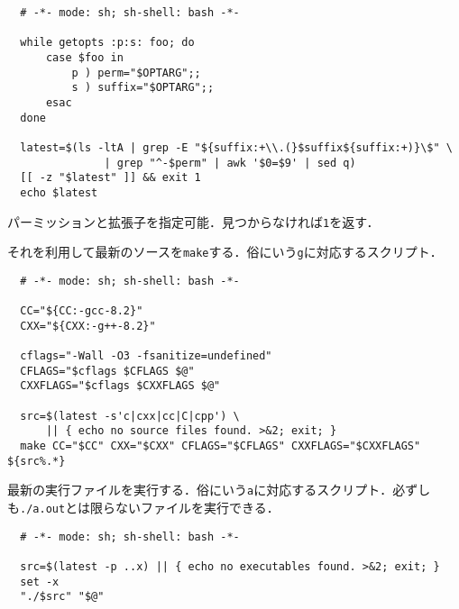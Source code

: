 \documentclass[a4paper]{jsarticle}
\begin{document}
\begin{lstlisting}
  # -*- mode: sh; sh-shell: bash -*-
  
  while getopts :p:s: foo; do
      case $foo in
          p ) perm="$OPTARG";;
          s ) suffix="$OPTARG";;
      esac
  done
  
  latest=$(ls -ltA | grep -E "${suffix:+\\.(}$suffix${suffix:+)}\$" \
               | grep "^-$perm" | awk '$0=$9' | sed q)
  [[ -z "$latest" ]] && exit 1
  echo $latest
\end{lstlisting}
パーミッションと拡張子を指定可能．見つからなければ\texttt{1}を返す．

それを利用して最新のソースを\texttt{make}する．俗にいう\texttt{g}に対応するスクリプト．
\begin{lstlisting}
  # -*- mode: sh; sh-shell: bash -*-
  
  CC="${CC:-gcc-8.2}"
  CXX="${CXX:-g++-8.2}"
  
  cflags="-Wall -O3 -fsanitize=undefined"
  CFLAGS="$cflags $CFLAGS $@"
  CXXFLAGS="$cflags $CXXFLAGS $@"
  
  src=$(latest -s'c|cxx|cc|C|cpp') \
      || { echo no source files found. >&2; exit; }
  make CC="$CC" CXX="$CXX" CFLAGS="$CFLAGS" CXXFLAGS="$CXXFLAGS" ${src%.*}
\end{lstlisting}

最新の実行ファイルを実行する．俗にいう\texttt{a}に対応するスクリプト．必ずしも\texttt{./a.out}とは限らないファイルを実行できる．
\begin{lstlisting}
  # -*- mode: sh; sh-shell: bash -*-
  
  src=$(latest -p ..x) || { echo no executables found. >&2; exit; }
  set -x
  "./$src" "$@"
\end{lstlisting}
\end{document}
